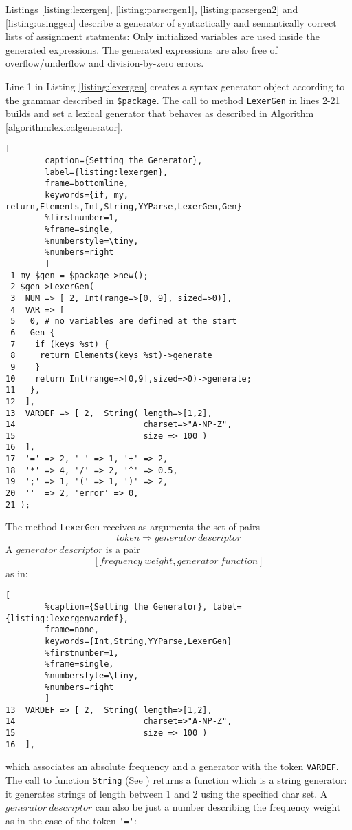 Listings 
\ref{listing:lexergen}, 
\ref{listing:parsergen1}, 
\ref{listing:parsergen2}
and 
\ref{listing:usinggen}
describe a generator of syntactically and semantically
correct lists of assignment statments: Only initialized variables 
are used inside the generated expressions. 
The generated expressions are also free 
of overflow/underflow and division-by-zero errors.

Line 1 in Listing \ref{listing:lexergen} creates a syntax generator
object according to the grammar described in \verb|$package|.
The call to method \verb|LexerGen| in lines 2-21 
builds and set a lexical generator that behaves 
as described in Algorithm \ref{algorithm:lexicalgenerator}.

\begin{lstlisting}[
        caption={Setting the Generator}, 
        label={listing:lexergen}, 
        frame=bottomline,
        keywords={if, my, return,Elements,Int,String,YYParse,LexerGen,Gen}
        %firstnumber=1, 
        %frame=single,
        %numberstyle=\tiny,
        %numbers=right
        ]
 1 my $gen = $package->new();
 2 $gen->LexerGen(
 3  NUM => [ 2, Int(range=>[0, 9], sized=>0)],
 4  VAR => [
 5   0, # no variables are defined at the start
 6   Gen {
 7    if (keys %st) {
 8     return Elements(keys %st)->generate 
 9    }
10    return Int(range=>[0,9],sized=>0)->generate;
11   },
12  ],
13  VARDEF => [ 2,  String( length=>[1,2], 
14                          charset=>"A-NP-Z", 
15                          size => 100 )
16  ],
17  '=' => 2, '-' => 1, '+' => 2, 
18  '*' => 4, '/' => 2, '^' => 0.5, 
19  ';' => 1, '(' => 1, ')' => 2, 
20  ''  => 2, 'error' => 0,
21 );
\end{lstlisting}


The  method \verb|LexerGen| 
receives as arguments the set of pairs 
\[token \Rightarrow generator\ descriptor\]
A $generator\ descriptor$  is a pair 
\[[frequency\ weight, generator\ function]\]
as in:
\begin{lstlisting}[
        %caption={Setting the Generator}, label={listing:lexergenvardef}, 
        frame=none,
        keywords={Int,String,YYParse,LexerGen}
        %firstnumber=1, 
        %frame=single,
        %numberstyle=\tiny,
        %numbers=right
        ]
13  VARDEF => [ 2,  String( length=>[1,2], 
14                          charset=>"A-NP-Z", 
15                          size => 100 )
16  ],
\end{lstlisting}
which associates an absolute frequency and
a generator with the token \verb|VARDEF|. 
The call to function \verb!String! 
(See \cite{testlectrotest})
returns a function
which is a string generator: it generates
strings of length between 1 and 2 using the specified
char set.
A $generator\ descriptor$ can also be just a number
describing the frequency weight as in the case of the token \verb|'='|:

